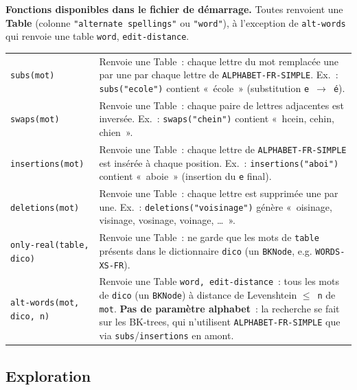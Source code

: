 \documentclass[12pt,a4paper]{article}
\begin{document}
\begin{codebox}
  \textbf{Fonctions disponibles dans le fichier de démarrage.} Toutes renvoient une \textbf{Table} (colonne \texttt{"alternate spellings"} ou \texttt{"word"}), à l'exception de \texttt{alt-words} qui renvoie une table \texttt{word}, \texttt{edit-distance}.

  \vspace{0.3em}
  \begin{tabularx}{\textwidth}{lX}
    \texttt{subs(mot)}     & Renvoie une Table~: chaque lettre du mot remplacée une par une par chaque lettre de \texttt{ALPHABET-FR-SIMPLE}. Ex.~: \texttt{subs("ecole")} contient «~école~» (substitution \texttt{e}~$\to$~\texttt{é}). \\
    \texttt{swaps(mot)}    & Renvoie une Table~: chaque paire de lettres adjacentes est inversée. Ex.~: \texttt{swaps("chein")} contient «~hcein, cehin, chien~». \\
    \texttt{insertions(mot)} & Renvoie une Table~: chaque lettre de \texttt{ALPHABET-FR-SIMPLE} est insérée à chaque position. Ex.~: \texttt{insertions("aboi")} contient «~aboie~» (insertion du \texttt{e} final). \\
    \texttt{deletions(mot)}  & Renvoie une Table~: chaque lettre est supprimée une par une. Ex.~: \texttt{deletions("voisinage")} génère «~oisinage, visinage, vosinage, voinage, \ldots~». \\
    \texttt{only-real(table, dico)} & Renvoie une Table~: ne garde que les mots de \texttt{table} présents dans le dictionnaire \texttt{dico} (un \texttt{BKNode}, e.g. \texttt{WORDS-XS-FR}). \\
    \texttt{alt-words(mot, dico, n)} & Renvoie une Table \texttt{word, edit-distance}~: tous les mots de \texttt{dico} (un \texttt{BKNode}) à distance de Levenshtein $\leq$~\texttt{n} de \texttt{mot}. \textbf{Pas de paramètre alphabet}~: la recherche se fait sur les BK-trees, qui n'utilisent \texttt{ALPHABET-FR-SIMPLE} que via \texttt{subs}/\texttt{insertions} en amont. \\
  \end{tabularx}
\end{codebox}

\subsection{Exploration}
\end{document}
